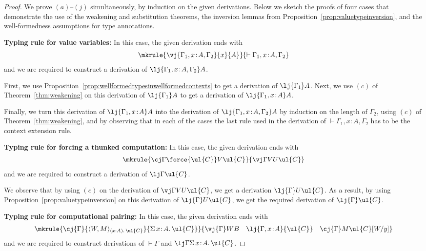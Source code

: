 \begin{proof}
We prove $(a)$--$(j)$ simultaneously, by induction on the given derivations. Below we sketch the proofs of four cases that demonstrate the use of the weakening and substitution theorems, the inversion lemmas from Proposition~\ref{prop:valuetypeinversion}, and the well-formedness assumptions for type annotations.

\vspace{0.2cm}

\noindent \textbf{Typing rule for value variables:}
In this case, the given derivation ends with
\[
\mkrule
{\vj {\Gamma_1, x \!:\! A, \Gamma_2} {x} {A}}
{\vdash \Gamma_1, x \!:\! A, \Gamma_2}
\]
and we are required to construct a derivation of $\lj {\Gamma_1, x \!:\! A, \Gamma_2} A$.


First, we use Proposition~\ref{prop:wellformedtypesinwellformedcontexts} to get a derivation of $\lj {\Gamma_1} A$. Next, we use $(c)$ of Theorem~\ref{thm:weakening} on this derivation of $\lj {\Gamma_1} A$ to get a derivation of  $\lj {\Gamma_1, x \!:\! A} A$. 

Finally, we turn this derivation of $\lj {\Gamma_1, x \!:\! A} A$ into the derivation of $\lj {\Gamma_1, x \!:\! A, \Gamma_2} A$ by induction on the length of $\Gamma_2$, using $(c)$ of Theorem~\ref{thm:weakening}, and by observing that in each of the cases the last rule used in the derivation of $\vdash \Gamma_1, x \!:\! A, \Gamma_2$ has to be the context extension rule.

\vspace{0.2cm}

\noindent \textbf{Typing rule for forcing a thunked computation:}
In this case, the given derivation ends with
\[
\mkrule
{\cj \Gamma {\force {\ul{C}} V} {\ul{C}}}
{\vj \Gamma V U\ul{C}}
\]
and we are required to construct a derivation of $\lj \Gamma \ul{C}$.

We observe that by using $(e)$ on the derivation of $\vj \Gamma V U\ul{C}$, we get a derivation $\lj {\Gamma} U\ul{C}$. As a result, by using Proposition~\ref{prop:valuetypeinversion} on this derivation of $\lj {\Gamma} U\ul{C}$, we get the required derivation of $\lj {\Gamma} \ul{C}$.

\vspace{0.2cm}

\noindent \textbf{Typing rule for computational pairing:}
In this case, the given derivation ends with
\[
\mkrule
{\cj {\Gamma} {\langle W , M \rangle_{(x : A).\, \ul{C}}} {\Sigma \, x \!:\! A .\, \ul{C}}}
{\vj {\Gamma} W B \quad \lj {\Gamma, x \!:\! A} {\ul{C}} \quad \cj {\Gamma} M {\ul{C}[W/y]}}
\]
and we are required to construct derivations of $\vdash \Gamma$ and $\lj \Gamma {\Sigma \, x \!:\! A .\, \ul{C}}$.



\end{proof}
